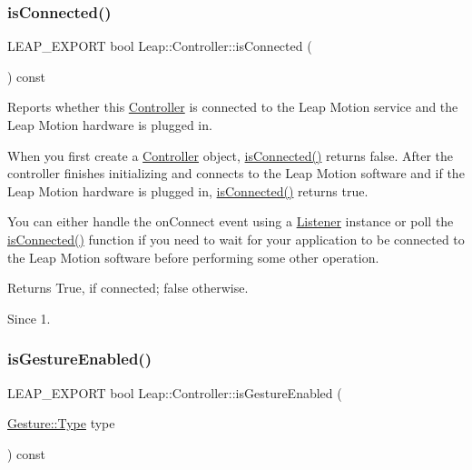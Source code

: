 \subsubsection{\texorpdfstring{is\+Connected()}{isConnected()}}
{\footnotesize\ttfamily L\+E\+A\+P\+\_\+\+E\+X\+P\+O\+RT bool Leap\+::\+Controller\+::is\+Connected (\begin{DoxyParamCaption}{ }\end{DoxyParamCaption}) const}

Reports whether this \hyperlink{class_leap_1_1_controller}{Controller} is connected to the Leap Motion service and the Leap Motion hardware is plugged in.

When you first create a \hyperlink{class_leap_1_1_controller}{Controller} object, \hyperlink{class_leap_1_1_controller_a38835f744f2c56ae8914378b75085f14}{is\+Connected()} returns false. After the controller finishes initializing and connects to the Leap Motion software and if the Leap Motion hardware is plugged in, \hyperlink{class_leap_1_1_controller_a38835f744f2c56ae8914378b75085f14}{is\+Connected()} returns true.

You can either handle the on\+Connect event using a \hyperlink{class_leap_1_1_listener}{Listener} instance or poll the \hyperlink{class_leap_1_1_controller_a38835f744f2c56ae8914378b75085f14}{is\+Connected()} function if you need to wait for your application to be connected to the Leap Motion software before performing some other operation.


\begin{DoxyCodeInclude}
\end{DoxyCodeInclude}
 \begin{DoxyReturn}{Returns}
True, if connected; false otherwise. 
\end{DoxyReturn}
\begin{DoxySince}{Since}
1. 
\end{DoxySince}
\mbox{\label{class_leap_1_1_controller_ada988c262060d8b3beba2d6d995ed345}} 
\subsubsection{\texorpdfstring{is\+Gesture\+Enabled()}{isGestureEnabled()}}
{\footnotesize\ttfamily L\+E\+A\+P\+\_\+\+E\+X\+P\+O\+RT bool Leap\+::\+Controller\+::is\+Gesture\+Enabled (\begin{DoxyParamCaption}\item[{\hyperlink{class_leap_1_1_gesture_a6fa6dd4f28c502f0d55abc6b71c6f9b1}{Gesture\+::\+Type}}]{type }\end{DoxyParamCaption}) const}

